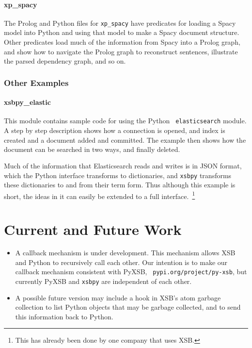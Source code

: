 \paragraph{xp\_spacy}
The Prolog and Python files for {\tt xp\_spacy} have predicates for
loading a Spacy model into Python and using that model to make a Spacy
document structure.  Other predicates load much of the information
from Spacy into a Prolog graph, and show how to navigate the Prolog
graph to reconstruct sentences, illustrate the parsed dependency graph,
and so on.

\subsubsection{Other Examples}

\paragraph{xsbpy\_elastic}
This module contains sample code for using the Python {\tt
  elasticsearch} module.  A step by step description shows how a
connection is opened, and index is created and a document added and
committed.  The example then shows how the document can be searched in
two ways, and finally deleted.

Much of the information that Elasticsearch reads and writes is in JSON
format, which the Python interface transforms to dictionaries, and
{\tt xsbpy} transforms these dictionaries to and from their term form.
Thus although this example is short, the ideas in it can easily be
extended to a full interface.~\footnote{This has already been done by
  one company that uses XSB.}


\section{Current and Future Work}

\begin{itemize}
\item A callback mechanism is under development.  This mechanism
  allows XSB and Python to recursively call each other.  Our intention
  is to make our callback mechanism consistent with PyXSB, {\tt
    pypi.org/project/py-xsb}, but currently PyXSB and {\tt xsbpy} are
  independent of each other.

\item A possible future version may include a hook in XSB's atom
  garbage collection to list Python objects that may be garbage
  collected, and to send this information back to Python.  
\end{itemize}  
